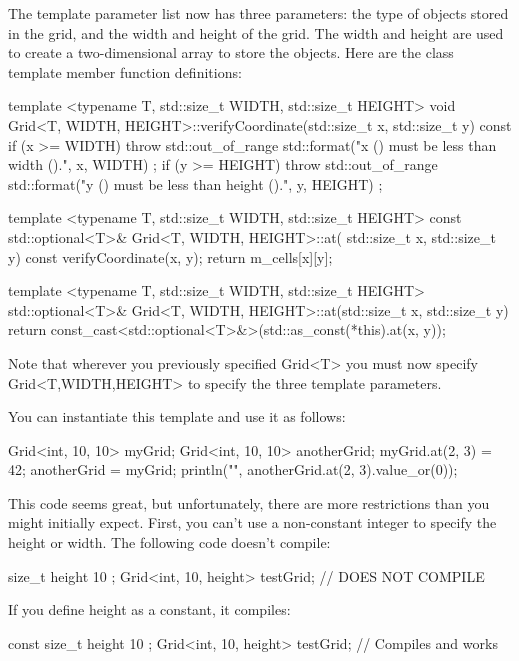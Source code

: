 The template parameter list now has three parameters: the type of objects stored in the grid, and the width and height of the grid. The width and height are used to create a two-dimensional array to store the objects. Here are the class template member function definitions:

\begin{cpp}
template <typename T, std::size_t WIDTH, std::size_t HEIGHT>
void Grid<T, WIDTH, HEIGHT>::verifyCoordinate(std::size_t x, std::size_t y) const
{
    if (x >= WIDTH) {
        throw std::out_of_range {
            std::format("x ({}) must be less than width ({}).", x, WIDTH) };
    }
    if (y >= HEIGHT) {
        throw std::out_of_range {
            std::format("y ({}) must be less than height ({}).", y, HEIGHT) };
    }
}

template <typename T, std::size_t WIDTH, std::size_t HEIGHT>
const std::optional<T>& Grid<T, WIDTH, HEIGHT>::at(
    std::size_t x, std::size_t y) const
{
    verifyCoordinate(x, y);
    return m_cells[x][y];
}

template <typename T, std::size_t WIDTH, std::size_t HEIGHT>
std::optional<T>& Grid<T, WIDTH, HEIGHT>::at(std::size_t x, std::size_t y)
{
    return const_cast<std::optional<T>&>(std::as_const(*this).at(x, y));
}
\end{cpp}

Note that wherever you previously specified Grid<T> you must now specify Grid<T,WIDTH,HEIGHT> to specify the three template parameters.

You can instantiate this template and use it as follows:

\begin{cpp}
Grid<int, 10, 10> myGrid;
Grid<int, 10, 10> anotherGrid;
myGrid.at(2, 3) = 42;
anotherGrid = myGrid;
println("{}", anotherGrid.at(2, 3).value_or(0));
\end{cpp}

This code seems great, but unfortunately, there are more restrictions than you might initially expect. First, you can’t use a non-constant integer to specify the height or width. The following code doesn’t compile:

\begin{cpp}
size_t height { 10 };
Grid<int, 10, height> testGrid; // DOES NOT COMPILE
\end{cpp}

If you define height as a constant, it compiles:

\begin{cpp}
const size_t height { 10 };
Grid<int, 10, height> testGrid; // Compiles and works
\end{cpp}

